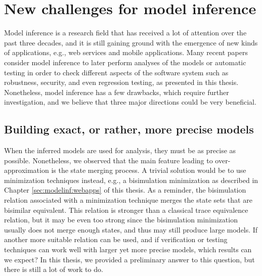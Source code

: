\section{New challenges for model inference}
\label{sec:conclusion:modelinf}

Model inference is a research field that has received a lot of
attention over the past three decades, and it is still gaining
ground with the emergence of new kinds of applications, e.g., web
services and mobile applications. Many recent papers consider
model inference to later perform analyses of the models or
automatic testing in order to check different aspects of the
software system such as robustness, security, and even regression
testing, as presented in this thesis. Nonetheless, model
inference has a few drawbacks, which require further
investigation, and we believe that three major directions could
be very beneficial.

\subsection{Building exact, or rather, more precise models}
\label{sec:conclusion:modelinf:exact}

When the inferred models are used for analysis, they must be as
precise as possible. Nonetheless, we observed that the main
feature leading to over-approximation is the state merging
process. A trivial solution would be to use minimization
techniques instead, e.g., a bisimulation minimization as
described in Chapter \ref{sec:modelinf:webapps} of this thesis.
As a reminder, the bisimulation relation associated with a
minimization technique merges the state sets that are bisimilar
equivalent. This relation is stronger than a classical trace
equivalence relation, but it may be even too strong since the
bisimulation minimization usually does not merge enough states,
and thus may still produce large models. If another more suitable
relation can be used, and if verification or testing techniques
can work well with larger yet more precise models, which results
can we expect? In this thesis, we provided a preliminary answer
to this question, but there is still a lot of work to do.

